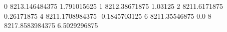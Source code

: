 0 8213.146484375 1.791015625
1 8212.38671875 1.03125
2 8211.6171875 0.26171875
4 8211.1708984375 -0.1845703125
6 8211.35546875 0.0
8 8217.8583984375 6.5029296875
